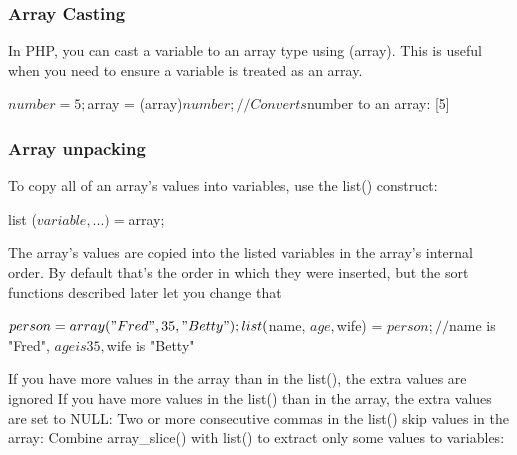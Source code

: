\documentclass{report}
\begin{document}
\subsubsection{Array Casting}
\bigbreak \noindent 
In PHP, you can cast a variable to an array type using (array). This is useful when you need to ensure a variable is treated as an array.
\bigbreak \noindent 
\begin{phpcode}
    $number = 5;
    $array = (array)$number; // Converts $number to an array: [5]
\end{phpcode}

\bigbreak \noindent 
\subsubsection{Array unpacking}
\bigbreak \noindent 
To copy all of an array’s values into variables, use the list() construct:
\bigbreak \noindent 
\begin{phpcode}
list ($variable, ...) = $array;
\end{phpcode}
\bigbreak \noindent 
The array’s values are copied into the listed variables in the array’s internal order. By
default that’s the order in which they were inserted, but the sort functions described
later let you change that
\bigbreak \noindent 
\begin{phpcode}
$person = array("Fred", 35, "Betty");
list($name, $age, $wife) = $person;
// $name is "Fred", $age is 35, $wife is "Betty"
\end{phpcode}
\bigbreak \noindent 
If you have more values in the array than in the list(), the extra values are ignored
\bigbreak \noindent 
If you have more values in the list() than in the array, the extra values are set to NULL:
\bigbreak \noindent 
Two or more consecutive commas in the list() skip values in the array:
\bigbreak \noindent 
Combine array\_slice() with list() to extract only some values to variables:

\bigbreak \noindent 
\end{document}
